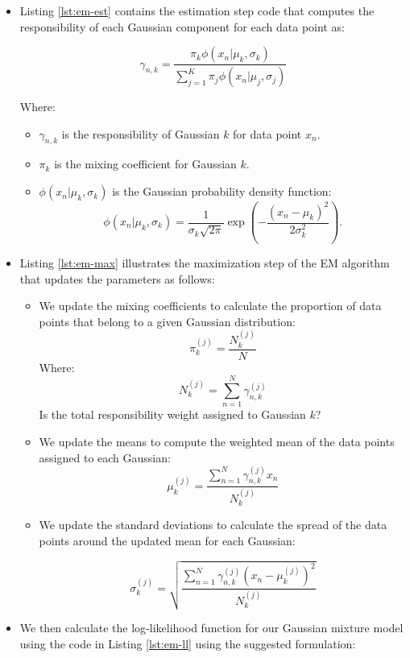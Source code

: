 \documentclass[]{article}
\begin{document}
\begin{itemize}
	\item Listing \ref{lst:em-est} contains the estimation step code that computes the responsibility of each Gaussian component for each data point as:
	
	$$
	\gamma_{n,k} = \frac{\pi_k \phi(x_n | \mu_k, \sigma_k)}{\sum_{j=1}^{K} \pi_j \phi(x_n | \mu_j, \sigma_j)}
	$$
	
	Where:
	\begin{itemize}
		\item $\gamma_{n,k}$ is the responsibility of Gaussian $k$ for data point $x_n$.
		\item $\pi_k$ is the mixing coefficient for Gaussian $k$.
		\item $\phi(x_n | \mu_k, \sigma_k)$ is the Gaussian probability density function:
		$$
		\phi(x_n | \mu_k, \sigma_k) = \frac{1}{\sigma_k \sqrt{2\pi}} \exp \left( -\frac{(x_n - \mu_k)^2}{2\sigma_k^2} \right).
		$$
	\end{itemize}	
	
	
	\item Listing \ref{lst:em-max} illustrates the maximization step of the EM algorithm that updates the parameters as follows:
	
	\begin{itemize}
		\item We update the mixing coefficients to calculate the proportion of data points that belong to a given Gaussian distribution:
		$$
		\pi_k^{(j)} = \frac{N_k^{(j)}}{N}
		$$
		Where:
		$$
		N_k^{(j)} = \sum_{n=1}^{N} \gamma_{n,k}^{(j)}
		$$
		Is the total responsibility weight assigned to Gaussian $k$?
		
		\item We update the means to compute the weighted mean of the data points assigned to each Gaussian:
		$$
		\mu_k^{(j)} = \frac{\sum_{n=1}^{N} \gamma_{n,k}^{(j)} x_n}{N_k^{(j)}}
		$$
		
		\item We update the standard deviations to calculate the spread of the data points around the updated mean for each Gaussian:
		
		$$
		\sigma_k^{(j)} = \sqrt{\frac{\sum_{n=1}^{N} \gamma_{n,k}^{(j)} (x_n - \mu_k^{(j)})^2}{N_k^{(j)}}}
		$$
	\end{itemize}
	
	
	\item We then calculate the log-likelihood function for our Gaussian mixture model using the code in Listing \ref{lst:em-ll} using the suggested formulation:
	

\end{itemize}
\end{document}

